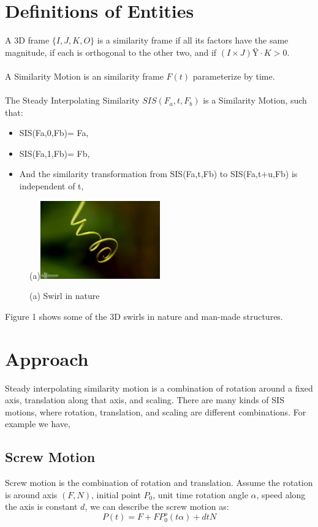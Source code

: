 \documentclass[twoside,11pt]{article}
\begin{document}
\section{Definitions of Entities}


A 3D frame $\{I,J,K,O\}$ is a similarity frame if all its factors have the same magnitude, if each is orthogonal to the other two, and if $(I \times J) \cdot K>0$.\\
\\
A Similarity Motion is an similarity frame $F(t)$ parameterize by time.\\
\\
The Steady Interpolating Similarity $SIS(F_a,t,F_b)$ is a Similarity Motion, such that:
\begin{itemize}
\item SIS(Fa,0,Fb)= Fa,
\item SIS(Fa,1,Fb)= Fb,
\item And the similarity transformation from SIS(Fa,t,Fb) to SIS(Fa,t+u,Fb) is independent of t,
\end{itemize}

\begin{figure}[h]
  \centering
  (a)\includegraphics[width=0.46\textwidth]{plant}
  \caption{(a) Swirl in nature}
  \label{fig:time}
\end{figure}

Figure 1 shows some of the 3D swirls in nature and man-made structures.

\section{Approach}
Steady interpolating similarity motion is a combination of rotation around a fixed axis, translation along that axis, and scaling. There are many kinds of SIS motions, where rotation, translation, and scaling are different combinations. For example we have,

\subsection{Screw Motion}
Screw motion is the combination of rotation and translation. Assume the rotation is around axis $(F, N)$, initial point $P_0$, unit time rotation angle $\alpha$, speed along the axis is constant $d$, we can describe the screw motion as:
\begin{equation}
P(t) = F + FP_0^o(t\alpha) + dtN
\end{equation}
\end{document}
